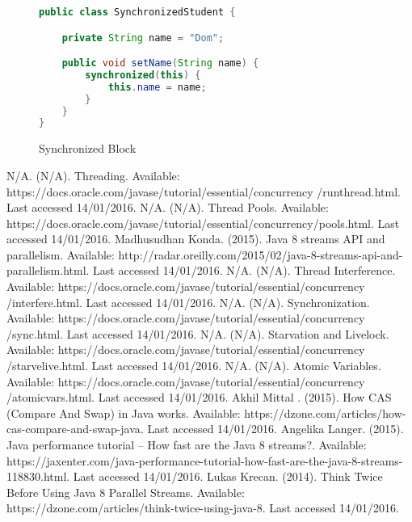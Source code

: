 \documentclass[]{report}
\begin{document}
\begin{figure}[h!]
\caption{Synchronized Block}
\begin{lstlisting}[language=Java,frame=single]
public class SynchronizedStudent {

	private String name = "Dom";

	public void setName(String name) {
		synchronized(this) {
			this.name = name;
		}
	}
}
\end{lstlisting}
\end{figure}

\begin{thebibliography}{20}
	N/A. (N/A). Threading. Available: https://docs.oracle.com/javase/tutorial/essential/concurrency
	/runthread.html. Last accessed 14/01/2016.
	N/A. (N/A). Thread Pools. Available: https://docs.oracle.com/javase/tutorial/essential/concurrency/pools.html. Last accessed 14/01/2016.
	Madhusudhan Konda. (2015). Java 8 streams API and parallelism. Available: http://radar.oreilly.com/2015/02/java-8-streams-api-and-parallelism.html. Last accessed 14/01/2016.
	N/A. (N/A). Thread Interference. Available: https://docs.oracle.com/javase/tutorial/essential/concurrency
	/interfere.html. Last accessed 14/01/2016.
	N/A. (N/A). Synchronization. Available: https://docs.oracle.com/javase/tutorial/essential/concurrency
	/sync.html. Last accessed 14/01/2016.
	N/A. (N/A). Starvation and Livelock. Available: https://docs.oracle.com/javase/tutorial/essential/concurrency
	/starvelive.html. Last accessed 14/01/2016.
	N/A. (N/A). Atomic Variables. Available: https://docs.oracle.com/javase/tutorial/essential/concurrency
	/atomicvars.html. Last accessed 14/01/2016.
	Akhil Mittal . (2015). How CAS (Compare And Swap) in Java works. Available: https://dzone.com/articles/how-cas-compare-and-swap-java. Last accessed 14/01/2016.
	Angelika Langer. (2015). Java performance tutorial – How fast are the Java 8 streams?. Available: https://jaxenter.com/java-performance-tutorial-how-fast-are-the-java-8-streams-118830.html. Last accessed 14/01/2016.
	Lukas Krecan. (2014). Think Twice Before Using Java 8 Parallel Streams. Available: https://dzone.com/articles/think-twice-using-java-8. Last accessed 14/01/2016.
\end{thebibliography}
\end{document}
